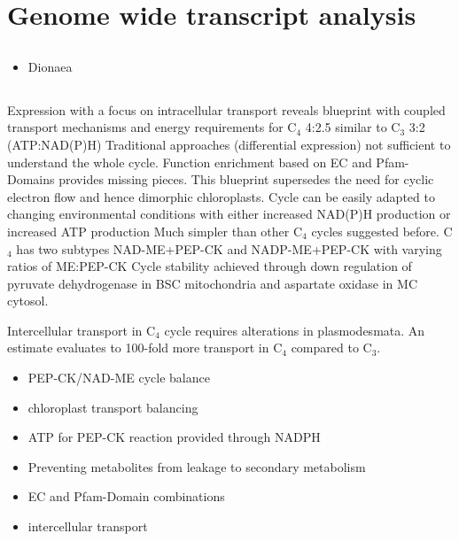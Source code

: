  \section{Genome wide transcript analysis}
 \subsection{}
 \begin{itemize}
 	\item Dionaea
 \end{itemize}
 \subsection{}
 Expression with a focus on intracellular transport reveals blueprint with coupled transport mechanisms and energy requirements for C$_4$ 4:2.5 similar to C$_3$ 3:2 (ATP:NAD(P)H)
 Traditional approaches (differential expression) not sufficient to understand the whole cycle.
 Function enrichment based on EC and Pfam-Domains provides missing pieces.
 This blueprint supersedes the need for cyclic electron flow and hence dimorphic chloroplasts.
 Cycle can be easily adapted to changing environmental conditions with either increased NAD(P)H production or increased ATP production
 Much simpler than other C$_4$ cycles suggested before.
 C$_4$ has two subtypes NAD-ME+PEP-CK and NADP-ME+PEP-CK with varying ratios of ME:PEP-CK
 Cycle stability achieved through down regulation of pyruvate dehydrogenase in BSC mitochondria and aspartate oxidase in MC cytosol.
 
 Intercellular transport in C$_4$ cycle requires alterations in plasmodesmata.
 An estimate evaluates to 100-fold more transport in C$_4$ compared to C$_3$.
 
	\begin{itemize}
		\item PEP-CK/NAD-ME cycle balance
		\item chloroplast transport balancing
		\item ATP for PEP-CK reaction provided through NADPH
		\item Preventing metabolites from leakage to secondary metabolism
		\item EC and Pfam-Domain combinations
		\item intercellular transport
	\end{itemize}
		